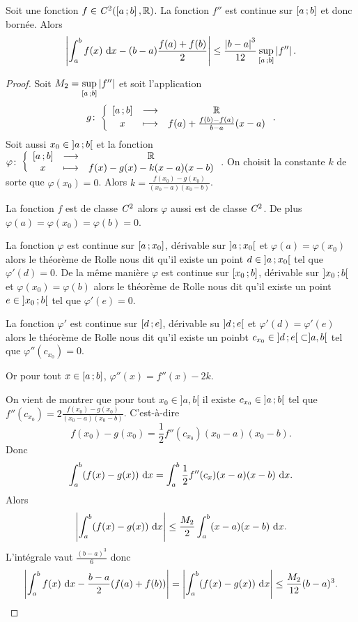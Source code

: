 \begin{lemme}
  Soit une fonction $f \in \mathit{C}^2(\left[ a \, ;  b \right],\mathbb{R})$. La fonction $f''$ est continue sur $\left[ a \, ;  b \right]$ et donc bornée. Alors
  \begin{equation}
    \left\lvert\int_a^bf(x)\,\mathop{}\mathopen{}\mathrm{d} x - (b-a)\frac{f(a)+f(b)}{2}\right\rvert \leq \frac{\left\lvert b-a\right\rvert^3}{12} \sup\limits_{\left[ a \, ;  b \right]}\left\lvert f''\right\rvert.
  \end{equation}
\end{lemme}
\begin{proof}
  Soit $M_2=\sup\limits_{\left[ a \, ;  b \right]}\left\lvert f''\right\rvert$ et soit l'application
  \begin{equation}
    g\colon \left\{\begin{array}{ccc} \left[ a \, ;  b \right] & \longrightarrow &\mathbb{R}\\ x & \longmapsto & f(a) + \frac{f(b)-f(a)}{b-a}(x-a) \end{array} \right..
  \end{equation}
  Soit aussi $x_0 \in \left] a \, ;  b \right[$ et la fonction$\varphi\colon \left\{\begin{array}{ccc} \left[ a \, ;  b \right] & \longrightarrow &\mathbb{R}\\ x & \longmapsto & f(x)-g(x)-k(x-a)(x-b) \end{array} \right.$. On choisit la constante $k$ de sorte que $\varphi(x_0)=0$.
  Alors $k=\frac{f(x_0)-g(x_0)}{(x_0-a)(x_0-b)}$.

  La fonction $f$ est de classe $\mathit{C}^2$ alors $\varphi$ aussi est de classe $\mathit{C}^2$. De plus $\varphi(a)=\varphi(x_0)=\varphi(b)=0$.

  La fonction $\varphi$ est continue sur $\left[ a \, ;  x_0 \right]$, dérivable sur $\left] a \, ;  x_0 \right[$ et $\varphi(a)=\varphi(x_0)$ alors le théorème de Rolle nous dit qu'il existe un point $d \in \left] a \, ;  x_0 \right[$ tel que $\varphi'(d)=0$. De la même manière  $\varphi$ est continue sur $\left[ x_0 \, ;  b \right]$, dérivable sur $\left] x_0 \, ;  b \right[$ et $\varphi(x_0)=\varphi(b)$ alors le théorème de Rolle nous dit qu'il existe un point $e \in \left] x_0 \, ;  b \right[$ tel que $\varphi'(e)=0$. 

La fonction $\varphi'$ est continue sur $\left[ d \, ;  e \right]$, dérivable su $\left] d \, ;  e \right[$ et $\varphi'(d)=\varphi'(e)$ alors le théorème de Rolle nous dit qu'il existe un poinbt $c_{x_0} \in \left] d \, ;  e \right[ \subset ]a,b[$ tel que $\varphi''(c_{x_0})=0$. 

Or pour tout $x \in \left[ a \, ;  b \right]$, $\varphi''(x)=f''(x)-2k$.

On vient de montrer que pour tout $x_0 \in ]a,b[$ il existe $c_{x_0} \in \left] a \, ;  b \right[$ tel que $f''(c_{x_0})=2\frac{f(x_0)-g(x_0)}{(x_0-a)(x_0-b)}$. C'est-à-dire
\begin{equation}
  f(x_0)-g(x_0)=\frac{1}{2} f''(c_{x_0})(x_0-a)(x_0-b).
\end{equation}
Donc
\begin{equation}
  \int_a^b (f(x)-g(x))\,\mathop{}\mathopen{}\mathrm{d} x = \int_a^b \frac{1}{2} f''(c_{x})(x-a)(x-b)\,\mathop{}\mathopen{}\mathrm{d} x.
\end{equation}
Alors
\begin{equation}
  \left\lvert\int_a^b (f(x)-g(x))\,\mathop{}\mathopen{}\mathrm{d} x\right\rvert \leq \frac{M_2}{2} \int_a^b (x-a)(x-b)\,\mathop{}\mathopen{}\mathrm{d} x.
\end{equation}
L'intégrale vaut $\frac{(b-a)^3}{6}$ donc
\begin{equation}
  \left\lvert\int_a^b f(x)\,\mathop{}\mathopen{}\mathrm{d} x -\frac{b-a}{2}(f(a)+f(b))\right\rvert = \left\lvert\int_a^b (f(x)-g(x))\,\mathop{}\mathopen{}\mathrm{d} x\right\rvert \leq \frac{M_2}{12} (b-a)^3.
\end{equation}
\end{proof}

